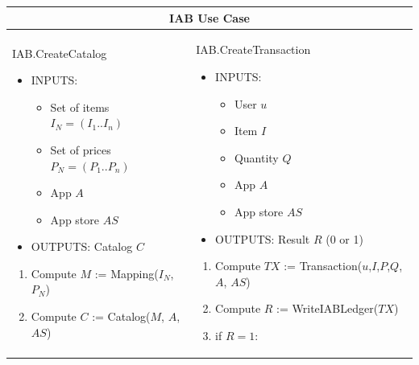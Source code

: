 \begin{table}[H]
\scriptsize
\centering
\begin{tabular}{|p{}p{}|}
\hline
\multicolumn{2}{|c|}{IAB Use Case} \\
\hline \vspace{0.1cm}
\textsf{IAB.CreateCatalog}
\vspace{-0.3cm}
\begin{itemize}
	\item INPUTS:
	\vspace{-0.4cm}
		\begin{itemize}
		\item Set of items $I_N = (I_1..I_n)$
		\item Set of prices $P_N = (P_1..P_n)$
		\item App $A$
		\item App store $AS$
	\end{itemize}
	\item OUTPUTS: Catalog $C$
\end{itemize}
\begin{enumerate}
	\item Compute $M$ := \textsf{Mapping}($I_N$, $P_N$)
	\item Compute $C$ := \textsf{Catalog}($M$, $A$, $AS$)
\end{enumerate} & 
\vspace{0.1cm} \textsf{IAB.CreateTransaction}
\vspace{-0.3cm}
\begin{itemize}
	\item INPUTS:
	\vspace{-0.4cm}
	\begin{itemize}
		\item User $u$
		\item Item $I$
		\item Quantity $Q$
		\item App $A$
		\item App store $AS$
	\end{itemize}
	\item OUTPUTS: Result $R$ (0 or 1)
\end{itemize}
\begin{enumerate}
	\item Compute $TX$ := \textsf{Transaction}($u$,$I$,$P$,$Q$,$A$, $AS$)
	\item Compute $R$ := \textsf{WriteIABLedger}($TX$)
	\item if $R = 1$:
	\begin{enumerate}

\end{enumerate}
\end{enumerate}
\end{tabular}
\end{table}
